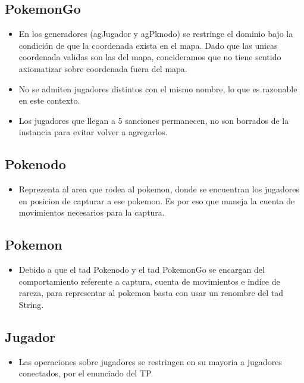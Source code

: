 
\subsection{PokemonGo}

\begin{itemize}
\item{En los generadores (agJugador y agPknodo) se restringe el dominio bajo la condici\'on de que la coordenada exista en el mapa. Dado que las unicas coordenada validas son las del mapa, concideramos que no tiene sentido axiomatizar sobre coordenada fuera del mapa.}

\item{No se admiten jugadores distintos con el mismo nombre, lo que es razonable en este contexto.}

\item{Los jugadores que llegan a 5 sanciones permanecen, no son borrados de la instancia para evitar volver a agregarlos.}

\end{itemize}


\subsection{Pokenodo}

\begin{itemize}
\item{Reprezenta al area que rodea al pokemon, donde se encuentran los jugadores en posicion de capturar a ese pokemon. Es por eso que maneja la cuenta de movimientos necesarios para la captura.}
\end{itemize}

\subsection{Pokemon}

\begin{itemize}
\item{Debido a que el tad Pokenodo y el tad PokemonGo se encargan del comportamiento referente a captura, cuenta de movimientos e indice de rareza, para representar al pokemon basta con usar un renombre del tad String.  }
\end{itemize}

\subsection{Jugador}

\begin{itemize}
\item{Las operaciones sobre jugadores se restringen en su mayoria a jugadores conectados, por el enunciado del TP.}
\end{itemize}

